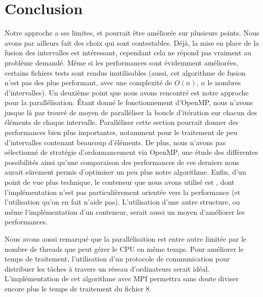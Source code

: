 \documentclass[a4paper, french]{article}
\begin{document}
\section{Conclusion}

Notre approche a ses limites, et pourrait être améliorée sur plusieurs points. Nous avons
par ailleurs fait des choix qui sont contestables. Déjà, la mise en place de la fusion des intervalles est
intéressant, cependant cela ne répond pas vraiment au problème demandé. Même si les performances sont
évidemment améliorées, certains fichiers tests sont rendus inutilisables (aussi, cet algorithme de
fusion n'est pas des plus performant, avec une complexité de $O(n)$, $n$ le nombres d'intervalles). Un
deuxième point que nous avons rencontré est notre approche pour la parallélisation. Étant donné le
fonctionnement d'OpenMP, nous n'avons jusque là par trouvé de moyen de paralléliser la boucle
d'itération sur chacun des éléments de chaque intervalle. Paralléliser cette section pourrait donner
des performances bien plus importantes, notamment pour le traitement de peu d'intervalles contenant
beaucoup d'éléments. De plus, nous n'avons pas sélectionné de stratégie d'ordonnancement via OpenMP,
une étude des différentes possibilités ainsi qu'une comparaison des performances de ces derniers
nous aurait sûrement permis d'optimiser un peu plus notre algorithme. Enfin, d'un point de vue plus
technique, le conteneur que nous avons utilisé est , dont l'implémentation n'est
pas particulièrement orientée vers la performance (et l'utilisation qu'on en fait n'aide pas).
L'utilisation d'une autre structure, ou même l'implémentation d'un conteneur, serait aussi un moyen
d'améliorer les performances.

Nous avons aussi remarqué que la parallélisation est entre autre limitée par le nombre de threads
que peut gérer le CPU en même temps. Pour améliorer le temps de traitement, l'utilisation d'un
protocole de communication pour distribuer les tâches à travers un réseau d'ordinateurs serait idéal.
L'implémentation de cet algorithme avec MPI permettra sans doute diviser encore plus le temps de
traitement du fichier 8.
\end{document}
